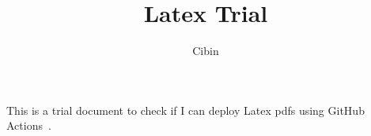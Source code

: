 \documentclass[10pt,a4paper]{article}
\title{Latex Trial}
\author{Cibin}
\begin{document}
	\maketitle
	
	This is a trial document to check if I can deploy Latex pdfs using GitHub Actions~\cite{Drela1989}.
	

\printbibliography
\end{document}
